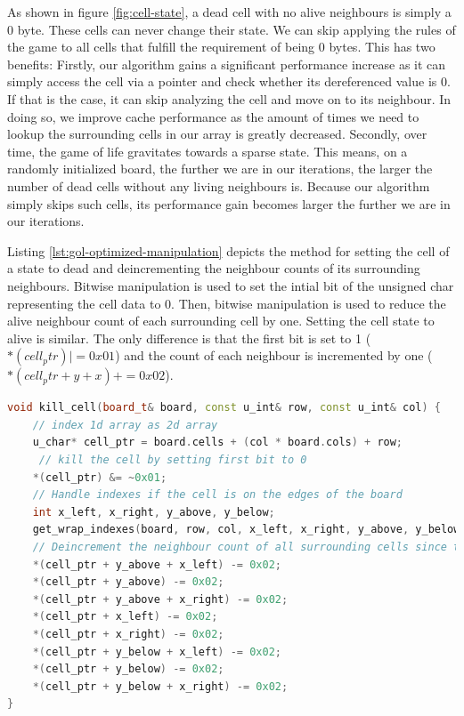 \documentclass[a4paper,english,12pt,twoside=false]{scrartcl} %
\begin{document}
As shown in figure \ref{fig:cell-state}, a dead cell with no alive neighbours is simply a 0 byte. These cells can never change their state. We can skip applying the rules of the game to all cells that fulfill the requirement of being 0 bytes. This has two benefits: Firstly, our algorithm gains a significant performance increase as it can simply access the cell via a pointer and check whether its dereferenced value is 0. If that is the case, it can skip analyzing the cell and move on to its neighbour. In doing so, we improve cache performance as the amount of times we need to lookup the surrounding cells in our array is greatly decreased. Secondly, over time, the game of life gravitates towards a sparse state. This means, on a randomly initialized board, the further we are in our iterations, the larger the number of dead cells without any living neighbours is. Because our algorithm simply skips such cells, its performance gain becomes larger the further we are in our iterations.

Listing \ref{lst:gol-optimized-manipulation} depicts the method for setting the cell of a state to dead and deincrementing the neighbour counts of its surrounding neighbours. Bitwise manipulation is used to set the intial bit of the unsigned char representing the cell data to 0. Then, bitwise manipulation is used to reduce the alive neighbour count of each surrounding cell by one. Setting the cell state to alive is similar. The only difference is that the first bit is set to 1 ($*(cell_ptr) |= 0x01$)  and the count of each neighbour is incremented by one ($*(cell_ptr + y + x) += 0x02$).

\begin{lstlisting}[caption={Parallel Naive State Generation Algorithm},label={lst:gol-optimized-manipulation},language=C++]
void kill_cell(board_t& board, const u_int& row, const u_int& col) {
    // index 1d array as 2d array
    u_char* cell_ptr = board.cells + (col * board.cols) + row;
     // kill the cell by setting first bit to 0
    *(cell_ptr) &= ~0x01;
    // Handle indexes if the cell is on the edges of the board
    int x_left, x_right, y_above, y_below;
    get_wrap_indexes(board, row, col, x_left, x_right, y_above, y_below);
    // Deincrement the neighbour count of all surrounding cells since the cell died
    *(cell_ptr + y_above + x_left) -= 0x02;
    *(cell_ptr + y_above) -= 0x02;
    *(cell_ptr + y_above + x_right) -= 0x02;
    *(cell_ptr + x_left) -= 0x02;
    *(cell_ptr + x_right) -= 0x02;
    *(cell_ptr + y_below + x_left) -= 0x02;
    *(cell_ptr + y_below) -= 0x02;
    *(cell_ptr + y_below + x_right) -= 0x02;
}
\end{lstlisting}
\end{document}
